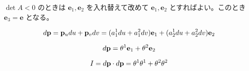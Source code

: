 \documentclass[a4paper,11pt]{jsarticle}
\numberwithin{equation}{section}
\begin{document}
$\det A < 0$ のときは $\mathbf{e}_1, \mathbf{e}_2$ を入れ替えて改めて $\mathbf{e}_1, \mathbf{e}_2$ とすればよい。このとき $\mathbf{e}_3 = \mathbf{e}$ となる。

\begin{equation}
d\vb{p} = \vb{p}_u du + \vb{p}_v dv = (a_1^1 du + a_1^2 dv) \mathbf{e}_1 + (a_2^1 du + a_2^2 dv) \mathbf{e}_2
\end{equation}

\begin{equation}
d\vb{p} = \theta^1 \mathbf{e}_1 + \theta^2 \mathbf{e}_2
\end{equation}

\begin{equation}
I = d\vb{p} \cdot d\vb{p} = \theta^1 \theta^1 + \theta^2 \theta^2
\end{equation}
\end{document}
